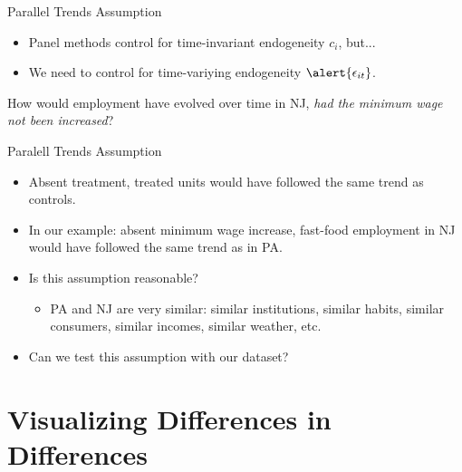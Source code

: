 \documentclass[9pt,aspectratio=169]{beamer}
\begin{document}
\begin{frame}{Parallel Trends Assumption}
\linespread{1.3}\selectfont %

\begin{itemize}
    \item Panel methods control for time-invariant endogeneity $c_i$, but...
    \item We need to control for time-variying endogeneity $\alert{\epsilon_{it}}$.
\end{itemize}
\pause
\begin{center}
    How would employment have evolved \alert{over time} in NJ, \textit{had the minimum wage \textit{not} been increased}?
\end{center}
\pause
\begin{block}{Paralell Trends Assumption}
    \begin{itemize}
    \item[$\rightarrow$] Absent treatment, treated units would have followed the same trend as controls. \pause
    \item In our example: absent minimum wage increase, fast-food employment in NJ would have followed the same trend as in PA. \pause
    \item Is this assumption reasonable? 
    \begin{itemize}
        \item PA and NJ are very similar: similar institutions, similar habits, similar consumers, similar incomes, similar weather, etc.
    \end{itemize}
    \item Can we test this assumption with our dataset?
\end{itemize}
\end{block}
\end{frame}

\section{Visualizing Differences in Differences}
\end{document}
